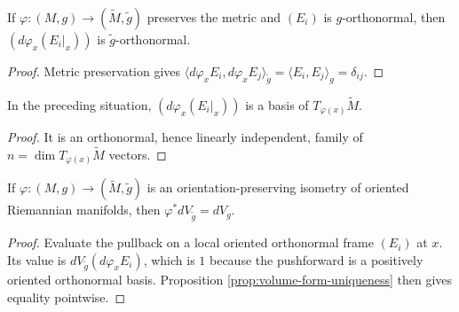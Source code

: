 \begin{lemma}
\label{lem:orthonormal-pushforward}
\leanok
{}
If $\varphi:(M,g)\to(\widetilde M,\widetilde g)$ preserves the metric and $(E_i)$ is $g$-orthonormal, then $(d\varphi_x(E_i|_x))$ is $\widetilde g$-orthonormal.
\end{lemma}

\begin{proof}
\leanok
{}
\sketch Metric preservation gives $\langle d\varphi_xE_i,d\varphi_xE_j\rangle_{\widetilde g}=\langle E_i,E_j\rangle_g=\delta_{ij}$.
\end{proof}

\begin{lemma}
\label{lem:push-basis}
\leanok
{}
In the preceding situation, $(d\varphi_x(E_i|_x))$ is a basis of $T_{\varphi(x)}\widetilde M$.
\end{lemma}

\begin{proof}
\leanok
{}
\sketch It is an orthonormal, hence linearly independent, family of $n=\dim T_{\varphi(x)}\widetilde M$ vectors.
\end{proof}

\begin{proposition}\label{prop:isometry-preserves-volume-form}
\leanok
{}
If $\varphi:(M,g)\to(\widetilde M,\widetilde g)$ is an orientation-preserving
isometry of oriented Riemannian manifolds, then
$\varphi^*dV_{\widetilde g}=dV_g$.
\end{proposition}

\begin{proof}
\leanok
{}
\sketch Evaluate the pullback on a local oriented orthonormal frame $(E_i)$ at $x$. Its value is $dV_{\widetilde g}(d\varphi_xE_i)$, which is $1$ because the pushforward is a positively oriented orthonormal basis. Proposition \ref{prop:volume-form-uniqueness} then gives equality pointwise.
\end{proof}

